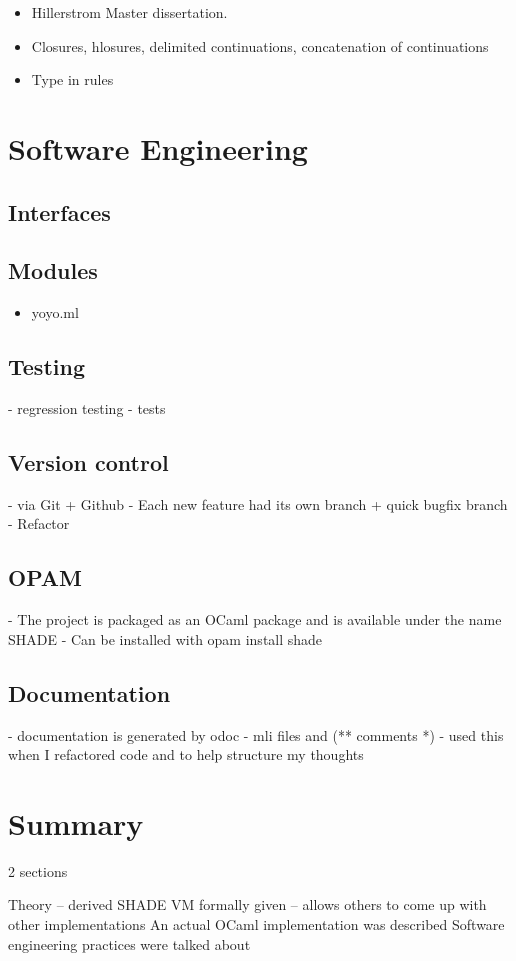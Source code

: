 \documentclass[class=article, crop=false]{standalone}
\begin{document}
\begin{itemize}
    \item Hillerstrom Master dissertation.
    \item Closures, hlosures, delimited continuations, concatenation of continuations
\end{itemize}

\begin{itemize}
    \item Type in rules
\end{itemize}





\section{Software Engineering}

\subsection{Interfaces}
\subsection{Modules}
\begin{itemize}
    \item yoyo.ml
\end{itemize}

\subsection{Testing}
- regression testing
- tests

\subsection{Version control}
- via Git + Github
- Each new feature had its own branch + quick bugfix branch
- Refactor

\subsection{OPAM}
- The project is packaged as an OCaml package and is available under the name SHADE
- Can be installed with opam install shade

\subsection{Documentation}
- documentation is generated by odoc
- mli files and (** comments *)
- used this when I refactored code and to help structure my thoughts

\section{Summary}

2 sections

Theory -- derived
SHADE VM formally given -- allows others to come up with other implementations
An actual OCaml implementation was described
Software engineering practices were talked about
\end{document}
